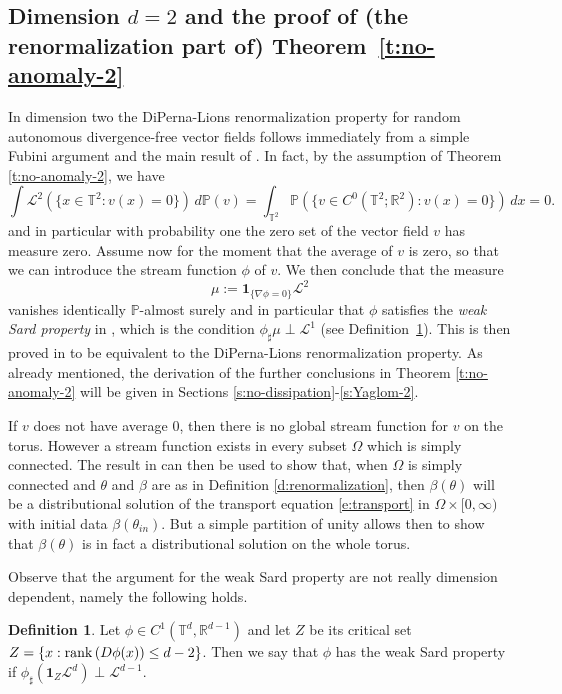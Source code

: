 \documentclass[11pt,reqno]{amsart}
\theoremstyle{definition}
\newtheorem{definition}[theorem]{Definition}
\numberwithin{equation}{section}
\begin{document}
\subsection{Dimension $d=2$ and the proof of (the renormalization part of) Theorem~\ref{t:no-anomaly-2}} 
In dimension two the DiPerna-Lions renormalization property for random autonomous \break divergence-free vector fields follows immediately from a simple Fubini argument and the main result of \cite{AlbertiBianchiniCrippa2014}. In fact, by the assumption of Theorem \ref{t:no-anomaly-2}, we have
\[
\int \mathcal{L}^2 (\{ x \in \mathbb{T}^2 : v (x) =0 \}) \, d{\mathbb P} (v) = \int_{\mathbb T^2} {\mathbb P} (\{v \in C^0 (\mathbb{T}^2; \mathbb{R}^2) : v(x) =0\}) \, dx = 0.
\]
and in particular with probability one the zero set of the vector field $v$ has measure zero. Assume now for the moment that the average of $v$ is zero, so that we can introduce the stream function $\phi$ of $v$. We then conclude that the measure 
\[
\mu := \mathbf{1}_{\{\nabla \phi =0\}} \mathcal{L}^2 
\]
vanishes identically $\mathbb{P}$-almost surely and in particular that $\phi$ satisfies the {\em weak Sard property} in \cite{AlbertiBianchiniCrippa2014}, which is the condition $\phi_\sharp \mu \perp \mathcal{L}^1$ (see Definition~\ref{d:weak-Sard}). This is then proved in \cite{AlbertiBianchiniCrippa2014} to be equivalent to the DiPerna-Lions renormalization property. As already mentioned, the derivation of the further conclusions in Theorem \ref{t:no-anomaly-2} will be given in Sections \ref{s:no-dissipation}-\ref{s:Yaglom-2}.

If $v$ does not have average $0$, then there is no global stream function for $v$ on the torus. However a stream function exists in every subset $\Omega$ which is simply connected. The result in \cite{AlbertiBianchiniCrippa2014} can then be used to show that, when $\Omega$ is simply connected and $\theta$ and $\beta$ are as in Definition \ref{d:renormalization}, then $\beta (\theta)$ will be a distributional solution of the transport equation \eqref{e:transport} in $\Omega \times [0, \infty)$ with initial data $\beta (\theta_{in})$. But a simple partition of unity allows then to show that $\beta (\theta)$ is in fact a distributional solution on the whole torus.

Observe that the argument for the weak Sard property are not really dimension dependent, namely the following holds.
\begin{definition}\label{d:weak-Sard}
Let $\phi\in C^1( \mathbb T^d, \mathbb R^{d-1})$ and let $Z$ be its critical set $Z=\{ x: {\rm rank}\, (D\phi (x)) \leq d-2\}$. Then we say that $\phi$ has the weak Sard property if $\phi_\sharp (\mathbf{1}_Z \mathcal{L}^d) \perp \mathcal{L}^{d-1}$.
\end{definition}
\end{document}
